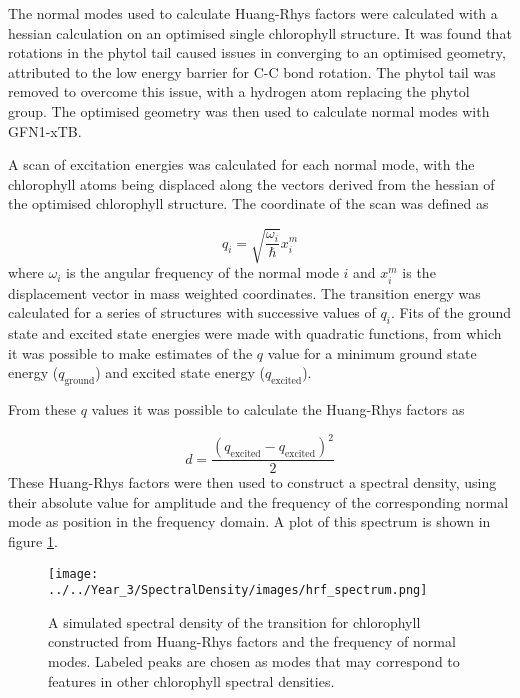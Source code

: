 The normal modes used to calculate Huang-Rhys factors were calculated with a hessian
calculation on an optimised single chlorophyll structure. It was found that rotations
in the phytol tail caused issues in converging to an optimised geometry, attributed
to the low energy barrier for C-C bond rotation. The phytol tail was removed to
overcome this issue, with a hydrogen atom replacing the phytol group. The optimised
geometry was then used to calculate normal modes with GFN1-xTB.

A scan of excitation energies was calculated for each normal mode, with the chlorophyll
atoms being displaced along the vectors derived from the hessian of the optimised
chlorophyll structure. The coordinate of the scan was defined as 

\begin{equation}
    q_i = \sqrt{\frac{\omega_i}{\hbar}} x^m_i
\end{equation}
%
where $\omega_i$ is the angular frequency of the normal mode $i$ and $x^m_i$ is
the displacement vector in mass weighted coordinates. The \Qy transition energy 
was calculated for a series of structures with successive values of $q_i$. Fits 
of the ground state and excited state energies were made with quadratic functions,
from which it was possible to make estimates of the $q$ value for a minimum ground
state energy ($q_{\text{ground}}$) and excited state energy ($q_{\text{excited}}$).

From these $q$ values it was possible to calculate the Huang-Rhys factors as

\begin{equation}
    d = \frac{\left(q_{\text{excited}} - q_{\text{excited}}\right)^2}{2}
\end{equation}
%
These Huang-Rhys factors were then used to construct a spectral density, using
their absolute value for amplitude and the frequency of the corresponding normal
mode as position in the frequency domain. A plot of this spectrum is shown in figure 
\ref{fig:specdens_hrf}.

\begin{figure}
    \centering
    \texttt{[image: ../../Year\_3/SpectralDensity/images/hrf\_spectrum.png]}
    \caption{A simulated spectral density of the \Qy transition for chlorophyll 
    constructed from Huang-Rhys factors and the frequency of normal modes. Labeled
    peaks are chosen as modes that may correspond to features in other chlorophyll
    spectral densities.}
    \label{fig:specdens_hrf}
\end{figure}

